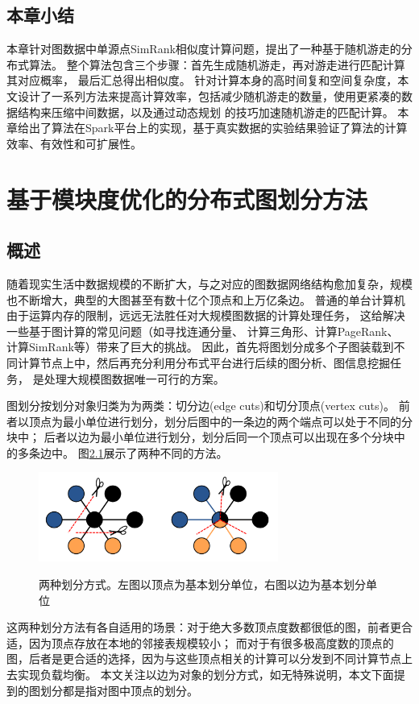 \documentclass[master]{njuthesis}
\begin{document}
\section{本章小结}
本章针对图数据中单源点SimRank相似度计算问题，提出了一种基于随机游走的分布式算法。
整个算法包含三个步骤：首先生成随机游走，再对游走进行匹配计算其对应概率，
最后汇总得出相似度。
针对计算本身的高时间复和空间复杂度，本文设计了一系列方法来提高计算效率，包括减少随机游走的数量，使用更紧凑的数据结构来压缩中间数据，以及通过动态规划
的技巧加速随机游走的匹配计算。
本章给出了算法在Spark平台上的实现，基于真实数据的实验结果验证了算法的计算效率、有效性和可扩展性。
\chapter{基于模块度优化的分布式图划分方法}\label{chapter_graphpartition}
\section{概述}
随着现实生活中数据规模的不断扩大，与之对应的图数据网络结构愈加复杂，规模也不断增大，典型的大图甚至有数十亿个顶点和上万亿条边。
普通的单台计算机由于运算内存的限制，远远无法胜任对大规模图数据的计算处理任务，
这给解决一些基于图计算的常见问题（如寻找连通分量\cite{DBLP:conf/sc/HongRO13}、
计算三角形\cite{DBLP:journals/corr/abs-1011-0468}、计算PageRank\cite{page1999pagerank}、
计算SimRank\cite{jeh2002simrank}等）带来了巨大的挑战。
因此，首先将图划分成多个子图装载到不同计算节点上中，然后再充分利用分布式平台进行后续的图分析、图信息挖掘任务，
是处理大规模图数据唯一可行的方案。

图划分按划分对象归类为为两类：切分边(edge cuts)和切分顶点(vertex cuts)。
前者以顶点为最小单位进行划分，划分后图中的一条边的两个端点可以处于不同的分块中；
后者以边为最小单位进行划分，划分后同一个顶点可以出现在多个分块中的多条边中。
图\ref{fig:partition_scheme}展示了两种不同的方法。
\begin{figure}[h]
  \centering
  \includegraphics[width= 0.7\textwidth]{figure/partition_approach.png}\\
  \caption{两种划分方式。左图以顶点为基本划分单位，右图以边为基本划分单位}
  \label{fig:partition_scheme}
\end{figure}
这两种划分方法有各自适用的场景\cite{DBLP:conf/eurosys/ChenSCC15}：对于绝大多数顶点度数都很低的图，前者更合适，因为顶点存放在本地的邻接表规模较小；
而对于有很多极高度数的顶点的图，后者是更合适的选择，因为与这些顶点相关的计算可以分发到不同计算节点上去实现负载均衡。
本文关注以边为对象的划分方式，如无特殊说明，本文下面提到的图划分都是指对图中顶点的划分。
\end{document}
